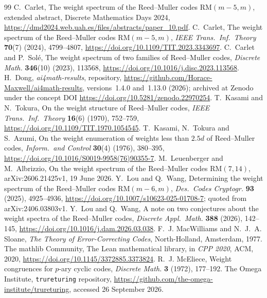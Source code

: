 \documentclass[11pt]{article}
\theoremstyle{remark}
\newcommand{\RM}{\mathrm{RM}}
\newcommand{\repoversion}{1.13.0}
\begin{document}
{\footnotesize
\begin{thebibliography}{99}
C.~Carlet, The weight spectrum of the Reed--Muller codes $\RM(m-5,m)$,
extended abstract, Discrete Mathematics Days 2024,
\url{https://dmd2024.web.uah.es/files/abstracts/paper_10.pdf}.
C.~Carlet, The weight spectrum of the Reed--Muller codes $\RM(m-5,m)$,
\emph{IEEE Trans.\ Inf.\ Theory} \textbf{70}(7) (2024), 4799--4807,
\url{https://doi.org/10.1109/TIT.2023.3343697}.
C.~Carlet and P.~Sol\'e, The weight spectrum of two families of Reed--Muller
codes, \emph{Discrete Math.} \textbf{346}(10) (2023), 113568,
\url{https://doi.org/10.1016/j.disc.2023.113568}.
H.~Dong, \emph{ai4math-results}, repository,
\url{https://github.com/Horace-Maxwell/ai4math-results}, versions~1.4.0
and~\repoversion{} (2026); archived at Zenodo under the concept DOI
\url{https://doi.org/10.5281/zenodo.22970254}.
T.~Kasami and N.~Tokura, On the weight structure of Reed--Muller codes,
\emph{IEEE Trans.\ Inf.\ Theory} \textbf{16}(6) (1970), 752--759,
\url{https://doi.org/10.1109/TIT.1970.1054545}.
T.~Kasami, N.~Tokura and S.~Azumi, On the weight enumeration of weights less
than $2.5d$ of Reed--Muller codes, \emph{Inform.\ and Control}
\textbf{30}(4) (1976), 380--395,
\url{https://doi.org/10.1016/S0019-9958(76)90355-7}.
M.~Leuenberger and M.~Albrizzio, On the weight spectrum of the Reed--Muller
codes $\RM(7,14)$, arXiv:2606.21425v1, 19 June 2026.
Y.~Lou and Q.~Wang, Determining the weight spectrum of the Reed--Muller codes
$\RM(m-6,m)$, \emph{Des.\ Codes Cryptogr.} \textbf{93} (2025), 4925--4936,
\url{https://doi.org/10.1007/s10623-025-01708-7}; quoted from
arXiv:2406.03803v1.
Y.~Lou and Q.~Wang, A note on two conjectures about the weight spectra of the
Reed--Muller codes, \emph{Discrete Appl.\ Math.} \textbf{388} (2026),
142--145, \url{https://doi.org/10.1016/j.dam.2026.03.038}.
F.~J. MacWilliams and N.~J.~A. Sloane, \emph{The Theory of Error-Correcting
Codes}, North-Holland, Amsterdam, 1977.
The mathlib Community, The Lean mathematical library, in \emph{CPP 2020},
ACM, 2020, \url{https://doi.org/10.1145/3372885.3373824}.
R.~J. McEliece, Weight congruences for $p$-ary cyclic codes, \emph{Discrete
Math.} \textbf{3} (1972), 177--192.
The Omega Institute, \texttt{trureturing} repository,
\url{https://github.com/the-omega-institute/trureturing}, accessed 26
September 2026.
\end{thebibliography}
}
\end{document}
